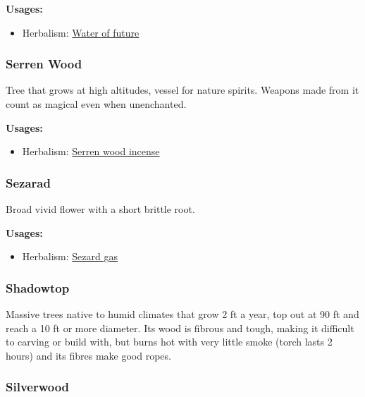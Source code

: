\vspace{5mm}

\textbf{Usages:}

\begin{itemize}[noitemsep]
\item[] Herbalism: \hyperref[Water of future]{Water of future}
\end{itemize}

\subsubsection{Serren Wood}
\label{Serren Wood}

Tree that grows at high altitudes, vessel for nature spirits. Weapons made from it count as magical even when unenchanted.

\vspace{5mm}

\textbf{Usages:}

\begin{itemize}[noitemsep]
\item[] Herbalism: \hyperref[Serren wood incense]{Serren wood incense}
\end{itemize}

\subsubsection{Sezarad}
\label{Sezarad}

Broad vivid flower with a short brittle root.

\vspace{5mm}

\textbf{Usages:}

\begin{itemize}[noitemsep]
\item[] Herbalism: \hyperref[Sezard gas]{Sezard gas}
\end{itemize}

\subsubsection{Shadowtop}

Massive trees native to humid climates that grow 2 ft a year, top out at 90 ft and reach a 10 ft or more diameter. Its wood is fibrous and tough, making it difficult to carving or build with, but burns hot with very little smoke (torch lasts 2 hours) and its fibres make good ropes.

\subsubsection{Silverwood}


